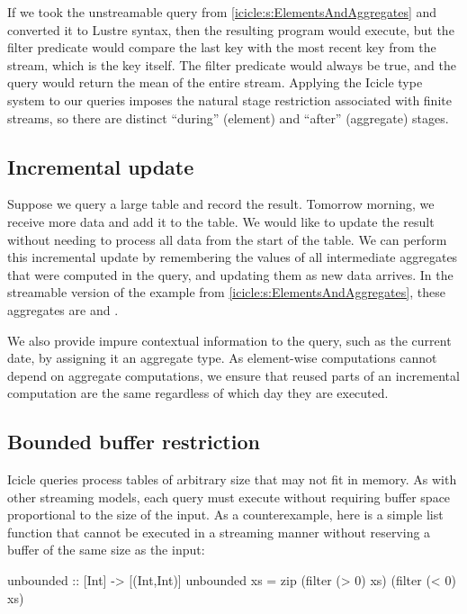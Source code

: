 If we took the unstreamable query from \cref{icicle:s:ElementsAndAggregates} and converted it to {\sc Lustre} syntax, then the resulting program would execute, but the filter predicate would compare the last key with the most recent key from the stream, which is the key itself.
The filter predicate would always be true, and the query would return the mean of the entire stream.
Applying the Icicle type system to our queries imposes the natural stage restriction associated with finite streams, so there are distinct ``during'' (element) and ``after'' (aggregate) stages.


\subsection{Incremental update}
Suppose we query a large table and record the result.
Tomorrow morning, we receive more data and add it to the table.
We would like to update the result without needing to process all data from the start of the table.
We can perform this incremental update by remembering the values of all intermediate aggregates that were computed in the query, and updating them as new data arrives.
In the streamable version of the \Ic@meanOfLatest@ example from \cref{icicle:s:ElementsAndAggregates}, these aggregates are \Ic@k@ and \Ic@avgs@. 

We also provide impure contextual information to the query, such as the current date, by assigning it an aggregate type.
As element-wise computations cannot depend on aggregate computations, we ensure that reused parts of an incremental computation are the same regardless of which day they are executed.


\subsection{Bounded buffer restriction}
\label{icicle:s:IcicleSource:bounded}
Icicle queries process tables of arbitrary size that may not fit in memory.
As with other streaming models, each query must execute without requiring buffer space proportional to the size of the input.
As a counterexample, here is a simple list function that cannot be executed in a streaming manner without reserving a buffer of the same size as the input:
\begin{haskell}
unbounded :: [Int] -> [(Int,Int)]
unbounded xs = zip (filter (> 0) xs) (filter (< 0) xs)
\end{haskell}


